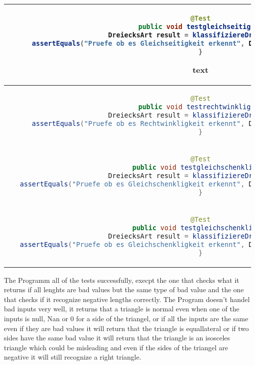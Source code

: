 \begin{parlist}
\begin{center}
\begin{tabular}{ | c | c | }
\begin{lstlisting}[language=java,frame=trBL]
@Test
public void testgleichseitig(){
   DreiecksArt result = klassifiziereDreieck(4,4,4);
   assertEquals("Pruefe ob es Gleichseitigkeit erkennt", DriecksArt.Gliechseitig, result);
}
  \end{lstlisting} text& testing branch 2 \\ 
\hline
  \begin{lstlisting}[language=java,frame=trBL]
@Test
public void testrechtwinklig(){
   DreiecksArt result = klassifiziereDreieck(3,4,5);
   assertEquals("Pruefe ob es Rechtwinkligkeit erkennt", DriecksArt.Rechtwinklig, result);
}
  \end{lstlisting} & Testing Branch 4 \\ 
  \hline
  \begin{lstlisting}[language=java,frame=trBL]
@Test
public void testgleichschenklig(){
   DreiecksArt result = klassifiziereDreieck(4,4,5);
   assertEquals("Pruefe ob es Gleichschenkligkeit erkennt", DriecksArt.Gleichschenklig, result);
}
  \end{lstlisting} &  Testing branch 3 \\ 
  \hline
  \begin{lstlisting}[language=java,frame=trBL]
@Test
public void testgleichschenklig(){
   DreiecksArt result = klassifiziereDreieck(2,4,5);
   assertEquals("Pruefe ob es Gleichschenkligkeit erkennt", DriecksArt.Gleichschenklig, result);
}
  \end{lstlisting} &  Testing branch 1 \\
\end{tabular}
\end{center}

\item The Programm all of the tests successfully, execpt the one that checks what it returns if all lenghts are bad values but the same type of bad value and the one that checks if it recognize negative lengths correctly. The Program doesn't handel bad inputs very well, it returns that a triangle is normal even when one of the inputs is null, Nan or 0 for a side of the triangel, or if all the inputs are the same even if they are bad values it will return that the triangle is equallateral or if two sides have the same bad value it will return that the triangle is an isosceles triangle which could be misleading and even if the sides of the triangel are negative it will still recognize a right triangle.


\end{parlist}
